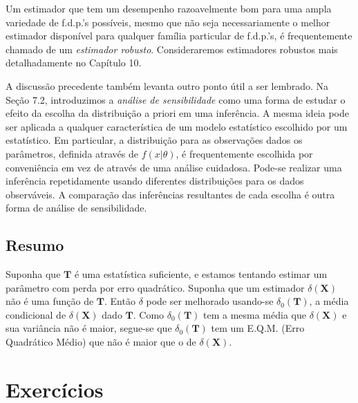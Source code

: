 \vspace{\baselineskip}

Um estimador que tem um desempenho razoavelmente bom para uma ampla variedade de f.d.p.'s possíveis, mesmo que não seja necessariamente o melhor estimador disponível para qualquer família particular de f.d.p.'s, é frequentemente chamado de um \textit{estimador robusto}. Consideraremos estimadores robustos mais detalhadamente no Capítulo 10.

\vspace{\baselineskip}

A discussão precedente também levanta outro ponto útil a ser lembrado. Na Seção 7.2, introduzimos a \textit{análise de sensibilidade} como uma forma de estudar o efeito da escolha da distribuição a priori em uma inferência. A mesma ideia pode ser aplicada a qualquer característica de um modelo estatístico escolhido por um estatístico. Em particular, a distribuição para as observações dados os parâmetros, definida através de $f(x|\theta)$, é frequentemente escolhida por conveniência em vez de através de uma análise cuidadosa. Pode-se realizar uma inferência repetidamente usando diferentes distribuições para os dados observáveis. A comparação das inferências resultantes de cada escolha é outra forma de análise de sensibilidade.

\subsection*{Resumo}

Suponha que $\mathbf{T}$ é uma estatística suficiente, e estamos tentando estimar um parâmetro com perda por erro quadrático. Suponha que um estimador $\delta(\mathbf{X})$ não é uma função de $\mathbf{T}$. Então $\delta$ pode ser melhorado usando-se $\delta_0(\mathbf{T})$, a média condicional de $\delta(\mathbf{X})$ dado $\mathbf{T}$. Como $\delta_0(\mathbf{T})$ tem a mesma média que $\delta(\mathbf{X})$ e sua variância não é maior, segue-se que $\delta_0(\mathbf{T})$ tem um E.Q.M. (Erro Quadrático Médio) que não é maior que o de $\delta(\mathbf{X})$.

\section*{Exercícios}


